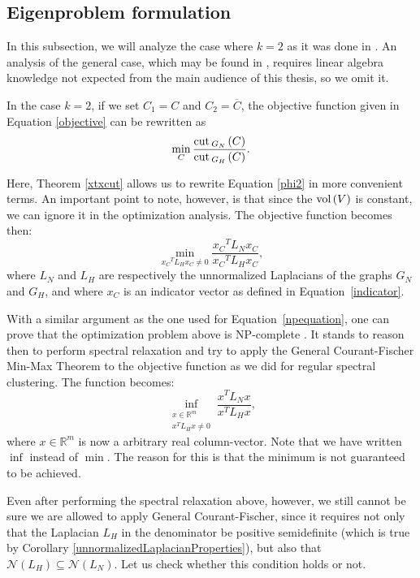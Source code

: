 \subsection{Eigenproblem formulation}
In this subsection, we will analyze the case where $k = 2$ as it was done in \cite{fastge2}.
An analysis of the general case, which may be found in \cite{fastge1}, requires linear algebra knowledge not expected from the main audience of this thesis, so we omit it.

In the case $k=2$, if we set $C_1 = C$ and $C_2 = \overline C$, the objective function given in Equation \vref{objective} can be rewritten as 
\begin{equation}\label{phi2}
   \min_C \frac{\operatorname{cut\,}_{G_N\,}(C)}{\operatorname{cut\,}_{G_H\,}(C)}.
\end{equation}

Here, Theorem \vref{xtxcut} allows us to rewrite Equation \vref{phi2} in more convenient terms. 
An important point to note, however, is that since the $\operatorname*{vol\,} (V)$ is constant, we can ignore it in the optimization analysis.
The objective function becomes then:
\begin{equation}
   \min_{{x_C}^TL_H {x_C} \ne 0} \frac{{x_C}^TL_N{x_C}}{{x_C}^TL_H{x_C}},
\end{equation}
where $L_N$ and $L_H$ are respectively the unnormalized Laplacians of the graphs $G_N$ and $G_H$, and where $x_C$ is an indicator vector as defined in Equation~\vref{indicator}.

With a similar argument as the one used for Equation~\vref{npequation}, one can prove that the optimization problem above is NP-complete \cite{fastge2}.
It stands to reason then to perform spectral relaxation and try to apply the General Courant-Fischer Min-Max Theorem to the objective function as we did for regular spectral clustering. The function becomes:
\begin{equation}\label{inf}
   \inf_{\substack{x \in \mathbb R^m \\ x^T L_H x \ne 0}} \frac{x^T L_N x}{x^T L_H x},
\end{equation}
where $x \in \mathbb R^{m }$ is now a arbitrary real column-vector.
Note that we have written $\inf$ instead of $\min$.
The reason for this is that the minimum is not guaranteed to be achieved.

Even after performing the spectral relaxation above, however, we still cannot be sure we are allowed to apply General Courant-Fischer, since it requires not only that the Laplacian $L_H$ in the denominator be positive semidefinite (which is true by Corollary \vref{unnormalizedLaplacianProperties}), but also that $\mathcal N (L_H) \subseteq \mathcal N (L_N)$. 
Let us check whether this condition holds or not.


